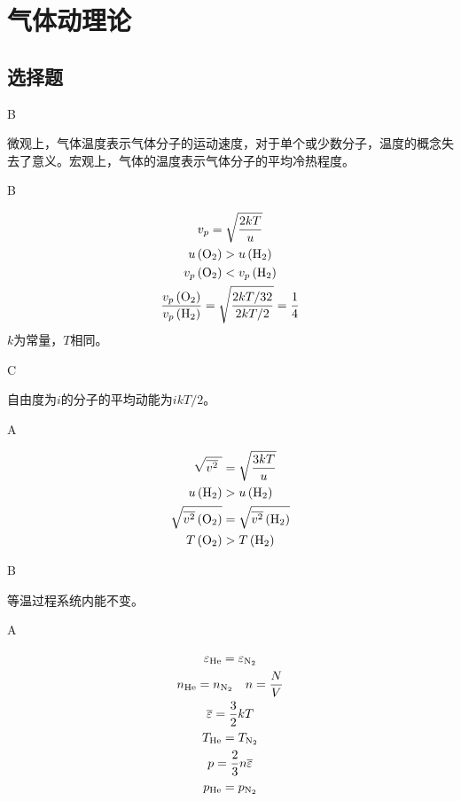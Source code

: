 \chapter{气体动理论}
\section{选择题}
\exercise B

\solve 微观上，气体温度表示气体分子的运动速度，对于单个或少数分子，温度的概念失去了意义。宏观上，气体的温度表示气体分子的平均冷热程度。

\exercise B

\solve
\begin{gather*} 
{v_p=\sqrt{\frac{2kT}{u}}}\\
{u\left(\ce{O2}\right)}>u\left(\ce{H2}\right)\\
{v_p\left(\ce{O2}\right)<v_p\left(\ce{H2}\right) } \\
\frac{v_p\left(\ce{O2}\right)}{v_p\left(\ce{H2}\right)}=\sqrt{\frac{2kT/32}{2kT/2}}=\frac{1}{4}
\end{gather*}
$k$为常量，$T$相同。

\exercise C

\solve 自由度为$i$的分子的平均动能为$ikT/2$。

\exercise A

\solve

$$
\begin{aligned} 
\sqrt{\overline{v^2}\ } &=\sqrt{\frac{3kT}{u}} \\
u\left(\ce{H2}\right)& > u\left(\ce{H2}\right) \\
\sqrt {\overline{v^2}\left(\ce{O2}\right)}& = \sqrt {\overline{v^2}\left(\ce{H2}\right)}\\
T\left(\ce{O2}\right)&>T\left(\ce{H2}\right) 
\end{aligned}
$$

\exercise B

\solve 等温过程系统内能不变。

\exercise A

\solve

\begin{gather*}
\varepsilon_{\ce{He}}=\varepsilon_{\ce{N2}}\\
n_{\ce{He}}=n_{\ce{N2}}\quad n=\frac{N}{V}\\
\overline{\varepsilon}=\frac{3}{2}kT\\
T_{\ce{He}}=T_{\ce{N2}}\\
p=\frac{2}{3}n\overline{\varepsilon}\\
p_{\ce{He}}=p_{\ce{N2}}
\end{gather*}

